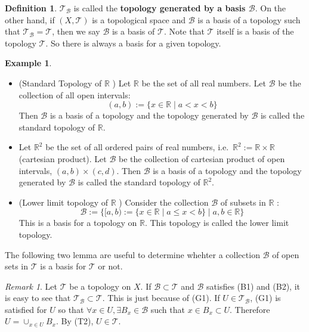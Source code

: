 \documentclass[
]{book}
\theoremstyle{definition}
\newtheorem{definition}{Definition}[chapter]
\theoremstyle{definition}
\newtheorem{example}{Example}[chapter]
\theoremstyle{definition}
\theoremstyle{definition}
\theoremstyle{remark}
\newtheorem*{remark}{Remark}
\begin{document}
\begin{definition}
\protect\hypertarget{def:unnamed-chunk-11}{}\label{def:unnamed-chunk-11}\(\mathcal{T}_{\mathcal{B}}\) is called the \textbf{topology generated by a basis \(\mathcal{B}\)}. On the other hand, if \((X, \mathcal{T})\) is a topological space and \(\mathcal{B}\) is a basis of a topology such that \(\mathcal{T}_{\mathcal{B}}=\mathcal{T}\), then we say \(\mathcal{B}\) is a basis of \(\mathcal{T}\). Note that \(\mathcal{T}\) itself is a basis of the topology \(\mathcal{T}\). So there is always a basis for a given topology.
\end{definition}

\begin{example}
\protect\hypertarget{exm:unnamed-chunk-12}{}\label{exm:unnamed-chunk-12}\leavevmode

\begin{itemize}
\item
  (Standard Topology of \(\mathbb{R}\) ) Let \(\mathbb{R}\) be the set of all real numbers. Let \(\mathcal{B}\) be the collection of all open intervals:
  \[
  (a, b):=\{x \in \mathbb{R} \mid a<x<b\}
  \]
  Then \(\mathcal{B}\) is a basis of a topology and the topology generated by \(\mathcal{B}\) is called the standard topology of \(\mathbb{R}\).
\item
  Let \(\mathbb{R}^{2}\) be the set of all ordered pairs of real numbers, i.e.~\(\mathbb{R}^{2}:=\mathbb{R} \times \mathbb{R}\) (cartesian product). Let \(\mathcal{B}\) be the collection of cartesian product of open intervals, \((a, b) \times(c, d)\). Then \(\mathcal{B}\) is a basis of a topology and the topology generated by \(\mathcal{B}\) is called the standard topology of \(\mathbb{R}^{2}\).
\item
  (Lower limit topology of \(\mathbb{R}\) ) Consider the collection \(\mathcal{B}\) of subsets in \(\mathbb{R}\) :
  \[
  \mathcal{B}:=\{[a, b):=\{x \in \mathbb{R} \mid a \leq x<b\} \mid a, b \in \mathbb{R}\}
  \]
  This is a basis for a topology on \(\mathbb{R}\). This topology is called the lower limit topology.
\end{itemize}

\end{example}

The following two lemma are useful to determine whehter a collection \(\mathcal{B}\) of open sets in \(\mathcal{T}\) is a basis for \(\mathcal{T}\) or not.

\begin{remark}
Let \(\mathcal{T}\) be a topology on \(X\). If \(\mathcal{B} \subset \mathcal{T}\) and \(\mathcal{B}\) satisfies (B1) and (B2), it is easy to see that \(\mathcal{T}_{\mathcal{B}} \subset \mathcal{T}\). This is just because of (G1). If \(U \in \mathcal{T}_{\mathcal{B}}\), (G1) is satisfied for \(U\) so that \(\forall x \in U, \exists B_{x} \in \mathcal{B}\) such that \(x \in B_{x} \subset U\). Therefore \(U=\cup_{x \in U} B_{x}\). By (T2), \(U \in \mathcal{T}\).
\end{remark}
\end{document}
